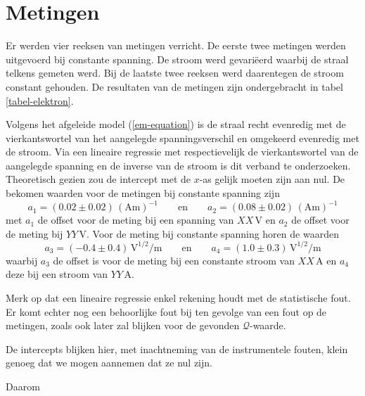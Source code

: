 \section{Metingen}


Er werden vier reeksen van metingen verricht. De eerste twee metingen 
werden uitgevoerd bij constante spanning. De stroom werd gevari\"eerd 
waarbij de straal telkens gemeten werd. Bij de laatste twee reeksen werd 
daarentegen de stroom constant gehouden. De resultaten van de metingen zijn 
ondergebracht in tabel \ref{tabel-elektron}.

Volgens het afgeleide model (\ref{em-equation}) is de straal recht 
evenredig met de vierkantswortel van het aangelegde spanningsverschil en 
omgekeerd evenredig met de stroom. Via een lineaire regressie met 
respectievelijk de vierkantswortel van de aangelegde spanning en de inverse 
van de stroom is dit verband te onderzoeken. Theoretisch gezien zou de 
intercept met de $x$-as gelijk moeten zijn aan nul.  De bekomen waarden 
voor de metingen bij constante spanning zijn
$$
a_1 = (0.02 \pm 0.02)\,(\textrm{Am})^{-1}
\qquad \textrm{en} \qquad
a_2 = (0.08 \pm 0.02)\,(\textrm{Am})^{-1}
$$
met $a_1$ de offset voor de meting bij een spanning van $XX$\,V en $a_2$ de 
offset voor de meting bij $YY$\,V. Voor de meting bij constante spanning 
horen de waarden
$$
a_3 = (-0.4 \pm 0.4)\,\textrm{V}^{1/2}\textrm{/m}
\qquad \textrm{en} \qquad
a_4 = (1.0 \pm 0.3)\,\textrm{V}^{1/2}\textrm{/m}
$$
waarbij $a_3$ de offset is voor de meting bij een constante stroom van 
$XX$\,A en $a_4$ deze bij een stroom van $YY$\,A.




Merk op dat een lineaire regressie enkel rekening houdt met de statistische 
fout. Er komt echter nog een behoorlijke fout bij ten gevolge van een fout 
op de metingen, zoals ook later zal blijken voor de gevonden 
$\mathcal{Q}$-waarde.

De intercepts blijken hier, met inachtneming van de instrumentele fouten, 
klein genoeg dat we mogen aannemen dat ze nul zijn.

Daarom
